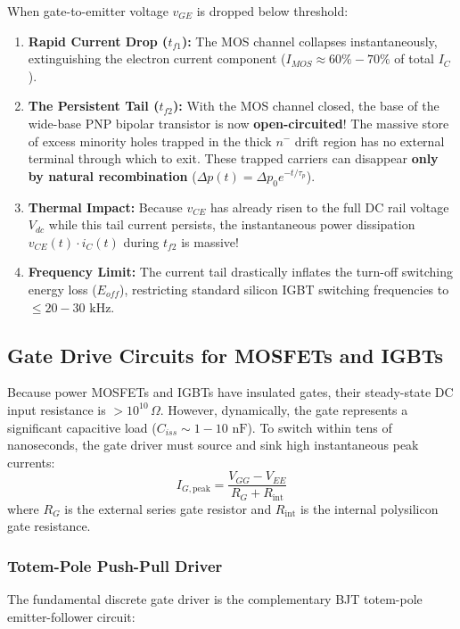 \documentclass[11pt,a4paper]{article}
\begin{document}
\begin{conceptbox}
When gate-to-emitter voltage $v_{GE}$ is dropped below threshold:
\begin{enumerate}
  \item \textbf{Rapid Current Drop ($t_{f1}$):} The MOS channel collapses instantaneously, extinguishing the electron current component ($I_{MOS} \approx 60\% - 70\%$ of total $I_C$).
  \item \textbf{The Persistent Tail ($t_{f2}$):} 
    With the MOS channel closed, the base of the wide-base PNP bipolar transistor is now \textbf{open-circuited}!
    The massive store of excess minority holes trapped in the thick $n^-$ drift region has no external terminal through which to exit.
    These trapped carriers can disappear \textbf{only by natural recombination} ($\Delta p(t) = \Delta p_0 e^{-t/\tau_p}$).
  \item \textbf{Thermal Impact:} Because $v_{CE}$ has already risen to the full DC rail voltage $V_{dc}$ while this tail current persists, the instantaneous power dissipation $v_{CE}(t) \cdot i_C(t)$ during $t_{f2}$ is massive!
  \item \textbf{Frequency Limit:} The current tail drastically inflates the turn-off switching energy loss ($E_{off}$), restricting standard silicon IGBT switching frequencies to $\le 20 - 30\text{ kHz}$.
\end{enumerate}
\end{conceptbox}

\subsection{Gate Drive Circuits for MOSFETs and IGBTs}

Because power MOSFETs and IGBTs have insulated gates, their steady-state DC input resistance is $> 10^{10}\,\Omega$. However, dynamically, the gate represents a significant capacitive load ($C_{iss} \sim 1 - 10\text{ nF}$). To switch within tens of nanoseconds, the gate driver must source and sink high instantaneous peak currents:
\begin{equation}
I_{G,\text{peak}} = \frac{V_{GG} - V_{EE}}{R_G + R_{\text{int}}}
\end{equation}
where $R_G$ is the external series gate resistor and $R_{\text{int}}$ is the internal polysilicon gate resistance.

\subsubsection{Totem-Pole Push-Pull Driver}
The fundamental discrete gate driver is the complementary BJT totem-pole emitter-follower circuit:
\end{document}
